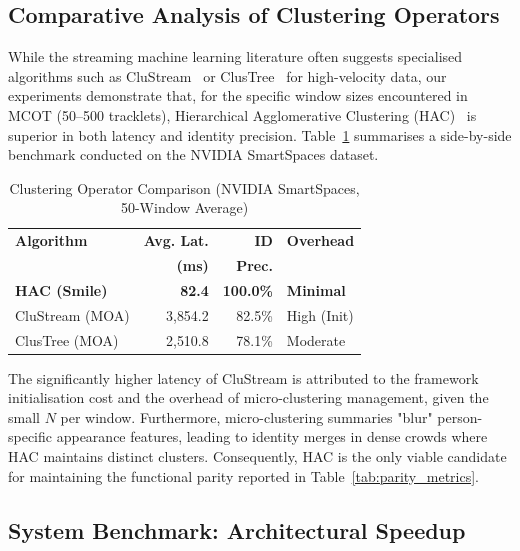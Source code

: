 \documentclass[5p,times]{elsarticle}
\begin{document}
\subsection{Comparative Analysis of Clustering Operators}
While the streaming machine learning literature often suggests specialised algorithms such as CluStream~\cite{aggarwal2003framework} or ClusTree~\cite{kranen2011clustree} for high-velocity data, our experiments demonstrate that, for the specific window sizes encountered in MCOT (50--500 tracklets), Hierarchical Agglomerative Clustering (HAC)~\cite{mullner2011modern} is superior in both latency and identity precision. Table~\ref{tab:clustering_comparison} summarises a side-by-side benchmark conducted on the NVIDIA SmartSpaces dataset.

\begin{table}[tbh!]
    \centering
    \small
    \setlength{\tabcolsep}{4pt}
    \caption{Clustering Operator Comparison (NVIDIA SmartSpaces, 50-Window Average)}
    \label{tab:clustering_comparison}
    \begin{tabular}{@{}lrrl@{}}
        \toprule
        \textbf{Algorithm} & \textbf{Avg. Lat.} & \textbf{ID} & \textbf{Overhead} \\
                           & \textbf{(ms)}      & \textbf{Prec.} & \\ \midrule
        \textbf{HAC (Smile)} & \textbf{82.4}   & \textbf{100.0\%} & \textbf{Minimal} \\
        CluStream (MOA)      & 3{,}854.2       & 82.5\%           & High (Init) \\
        ClusTree (MOA)       & 2{,}510.8       & 78.1\%           & Moderate \\ \bottomrule
    \end{tabular}
\end{table}

The significantly higher latency of CluStream is attributed to the framework initialisation cost and the overhead of micro-clustering management, given the small $N$ per window. Furthermore, micro-clustering summaries "blur" person-specific appearance features, leading to identity merges in dense crowds where HAC maintains distinct clusters. Consequently, HAC is the only viable candidate for maintaining the functional parity reported in Table~\ref{tab:parity_metrics}.

\subsection{System Benchmark: Architectural Speedup}
\label{sec:eval:speedup}
\end{document}
